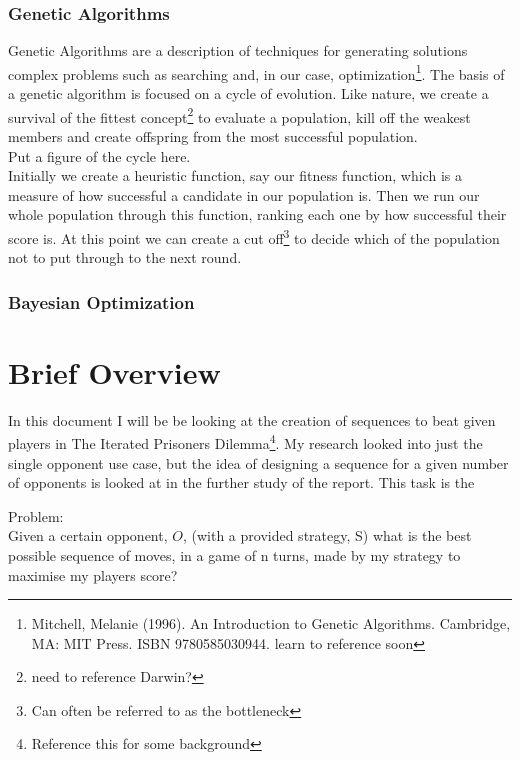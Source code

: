             \subsubsection{Genetic Algorithms}
            Genetic Algorithms are a description of techniques for generating solutions complex problems such as searching and, in our case, optimization\footnote{Mitchell, Melanie (1996). An Introduction to Genetic Algorithms. Cambridge, MA: MIT Press. ISBN 9780585030944. learn to reference soon}. The basis of a genetic algorithm is focused on a cycle of evolution. Like nature, we create a survival of the fittest concept\footnote{need to reference Darwin?} to evaluate a population, kill off the weakest members and create offspring from the most successful population.\\
            
            Put a figure of the cycle here. \label{fig:genetic algo cycle} \\
                       
            Initially we create a heuristic function, say our fitness function, which is a measure of how successful a candidate in our population is. Then we run our whole population through this function, ranking each one by how successful their score is. At this point we can create a cut off\footnote{Can often be referred to as the bottleneck} to decide which of the population not to put through to the next round.\\ 

            

            \subsubsection{Bayesian Optimization}

    \section{Brief Overview}
    In this document I will be be looking at the creation of sequences to beat given players in The Iterated Prisoners Dilemma\footnote{Reference this for some background}. My research looked into just the single opponent use case, but the idea of designing a sequence for a given number of opponents is looked at in the further study of the report. This task is the 
    
    
    Problem:\\
    Given a certain opponent, $O$, (with a provided strategy, S) what is the best possible sequence of moves, in a game of n turns, made by my strategy to maximise my players score? 

